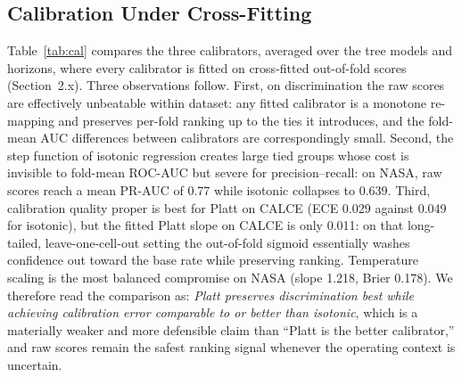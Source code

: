 \documentclass[IJPHM, 2014, 00]{PHMSociety}
\begin{document}
\subsection{Calibration Under Cross-Fitting}
Table~\ref{tab:cal} compares the three calibrators, averaged over the tree models and horizons, where every calibrator is fitted on cross-fitted out-of-fold scores (Section~2.x). Three observations follow. First, on discrimination the raw scores are effectively unbeatable within dataset: any fitted calibrator is a monotone re-mapping and preserves per-fold ranking up to the ties it introduces, and the fold-mean AUC differences between calibrators are correspondingly small. Second, the step function of isotonic regression creates large tied groups whose cost is invisible to fold-mean ROC-AUC but severe for precision--recall: on NASA, raw scores reach a mean PR-AUC of 0.77 while isotonic collapses to 0.639. Third, calibration quality proper is best for Platt on CALCE (ECE 0.029 against 0.049 for isotonic), but the fitted Platt slope on CALCE is only 0.011: on that long-tailed, leave-one-cell-out setting the out-of-fold sigmoid essentially washes confidence out toward the base rate while preserving ranking. Temperature scaling is the most balanced compromise on NASA (slope 1.218, Brier 0.178). We therefore read the comparison as: \emph{Platt preserves discrimination best while achieving calibration error comparable to or better than isotonic}, which is a materially weaker and more defensible claim than ``Platt is the better calibrator,'' and raw scores remain the safest ranking signal whenever the operating context is uncertain.

\begin{table}[!t]
\caption{Calibration Quality Averaged Over Tree Models and Horizons. All Calibrators Are Fitted on Cross-Fitted Out-of-Fold Scores. Slope 1 / Intercept 0 Indicate Perfect Probabilistic Calibration.}
\label{tab:cal}
\centering
{}
\end{table}
\end{document}
